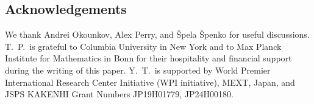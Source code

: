 \documentclass [11pt,oneside,a4paper,mathscr]{amsart}
\theoremstyle{definition}
\begin{document}






\subsection{Acknowledgements}
We thank Andrei Okounkov, Alex Perry, and \v{S}pela \v{S}penko for useful discussions. 
T.~P.~is grateful to Columbia University in New York and to Max Planck Institute for Mathematics in Bonn for their hospitality and financial support during the writing of this paper.
Y.~T.~is supported by World Premier International Research Center
	Initiative (WPI initiative), MEXT, Japan, and JSPS KAKENHI Grant Numbers JP19H01779, JP24H00180.
\end{document}
